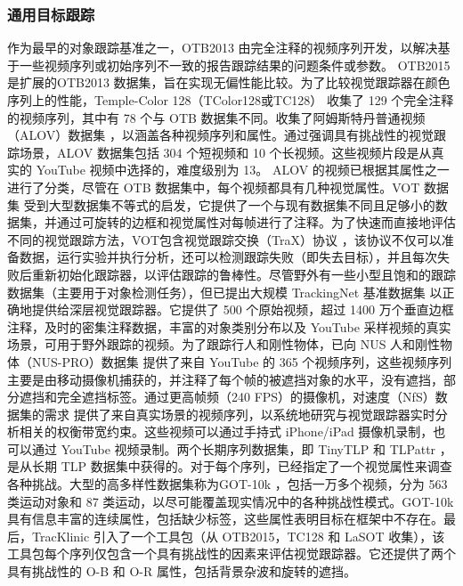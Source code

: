 \subsubsection{通用目标跟踪}
作为最早的对象跟踪基准之一，OTB2013 \cite{OTB} 由完全注释的视频序列开发，以解决基于一些视频序列或初始序列不一致的报告跟踪结果的问题条件或参数。 OTB2015 \cite{OTB2015} 是扩展的OTB2013 数据集，旨在实现无偏性能比较。为了比较视觉跟踪器在颜色序列上的性能，Temple-Color 128（TColor128或TC128）\cite{TC128} 收集了 129 个完全注释的视频序列，其中有 78 个与 OTB 数据集不同。收集了阿姆斯特丹普通视频（ALOV）数据集 \cite{ALOV} ，以涵盖各种视频序列和属性。通过强调具有挑战性的视觉跟踪场景，ALOV 数据集包括 304 个短视频和 10 个长视频。这些视频片段是从真实的 YouTube 视频中选择的，难度级别为 13。 ALOV 的视频已根据其属性之一进行了分类，尽管在 OTB 数据集中，每个视频都具有几种视觉属性。VOT 数据集 \cite{VOT2015} 受到大型数据集不等式的启发，它提供了一个与现有数据集不同且足够小的数据集，并通过可旋转的边框和视觉属性对每帧进行了注释。为了快速而直接地评估不同的视觉跟踪方法，VOT包含视觉跟踪交换（TraX）协议 \cite{TraX} ，该协议不仅可以准备数据，运行实验并执行分析，还可以检测跟踪失败（即失去目标），并且每次失败后重新初始化跟踪器，以评估跟踪的鲁棒性。尽管野外有一些小型且饱和的跟踪数据集（主要用于对象检测任务），但已提出大规模 TrackingNet 基准数据集 \cite{muller2018trackingnet} 以正确地提供给深层视觉跟踪器。它提供了 500 个原始视频，超过 1400 万个垂直边框注释，及时的密集注释数据，丰富的对象类别分布以及 YouTube 采样视频的真实场景，可用于野外跟踪的视频。为了跟踪行人和刚性物体，已向 NUS 人和刚性物体（NUS-PRO）数据集 \cite{NUS} 提供了来自 YouTube 的 365 个视频序列，这些视频序列主要是由移动摄像机捕获的，并注释了每个帧的被遮挡对象的水平，没有遮挡，部分遮挡和完全遮挡标签。通过更高帧频（240 FPS）的摄像机，对速度（NfS）数据集的需求 \cite{Nfs} 提供了来自真实场景的视频序列，以系统地研究与视觉跟踪器实时分析相关的权衡带宽约束。这些视频可以通过手持式 iPhone/iPad 摄像机录制，也可以通过 YouTube 视频录制。两个长期序列数据集，即 TinyTLP 和 TLPattr \cite{moudgil2018long}，是从长期 TLP 数据集中获得的。对于每个序列，已经指定了一个视觉属性来调查各种挑战。大型的高多样性数据集称为GOT-10k \cite{GOT-10k}，包括一万多个视频，分为 563 类运动对象和 87 类运动，以尽可能覆盖现实情况中的各种挑战性模式。GOT-10k 具有信息丰富的连续属性，包括缺少标签，这些属性表明目标在框架中不存在。最后，TracKlinic \cite{TracKlinic} 引入了一个工具包（从 OTB2015，TC128 和 LaSOT 收集），该工具包每个序列仅包含一个具有挑战性的因素来评估视觉跟踪器。它还提供了两个具有挑战性的 O-B 和 O-R 属性，包括背景杂波和旋转的遮挡。 
